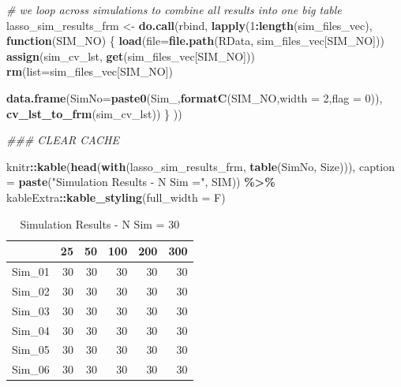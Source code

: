 \documentclass[
]{book}
\newenvironment{Shaded}{\begin{snugshade}}{\end{snugshade}}
\newcommand{\CommentTok}[1]{\textcolor[rgb]{0.56,0.35,0.01}{\textit{#1}}}
\newcommand{\ControlFlowTok}[1]{\textcolor[rgb]{0.13,0.29,0.53}{\textbf{#1}}}
\newcommand{\DataTypeTok}[1]{\textcolor[rgb]{0.13,0.29,0.53}{#1}}
\newcommand{\DecValTok}[1]{\textcolor[rgb]{0.00,0.00,0.81}{#1}}
\newcommand{\KeywordTok}[1]{\textcolor[rgb]{0.13,0.29,0.53}{\textbf{#1}}}
\newcommand{\NormalTok}[1]{#1}
\newcommand{\OperatorTok}[1]{\textcolor[rgb]{0.81,0.36,0.00}{\textbf{#1}}}
\newcommand{\StringTok}[1]{\textcolor[rgb]{0.31,0.60,0.02}{#1}}
\begin{document}
\begin{Shaded}
\begin{Highlighting}[]
\CommentTok{\# we loop across simulations to combine all results into one big table}
\NormalTok{lasso\_sim\_results\_frm <{-}}\StringTok{ }\KeywordTok{do.call}\NormalTok{(}\StringTok{\textquotesingle{}rbind\textquotesingle{}}\NormalTok{, }\KeywordTok{lapply}\NormalTok{(}\DecValTok{1}\OperatorTok{:}\KeywordTok{length}\NormalTok{(sim\_files\_vec),}
 \ControlFlowTok{function}\NormalTok{(SIM\_NO) \{}
  \KeywordTok{load}\NormalTok{(}\DataTypeTok{file=}\KeywordTok{file.path}\NormalTok{(}\StringTok{\textquotesingle{}RData\textquotesingle{}}\NormalTok{, sim\_files\_vec[SIM\_NO]))}
  \KeywordTok{assign}\NormalTok{(}\StringTok{\textquotesingle{}sim\_cv\_lst\textquotesingle{}}\NormalTok{, }\KeywordTok{get}\NormalTok{(sim\_files\_vec[SIM\_NO]))}
  \KeywordTok{rm}\NormalTok{(}\DataTypeTok{list=}\NormalTok{sim\_files\_vec[SIM\_NO])}
  
  \KeywordTok{data.frame}\NormalTok{(}\DataTypeTok{SimNo=}\KeywordTok{paste0}\NormalTok{(}\StringTok{\textquotesingle{}Sim\_\textquotesingle{}}\NormalTok{,}\KeywordTok{formatC}\NormalTok{(SIM\_NO,}\DataTypeTok{width =} \DecValTok{2}\NormalTok{,}\DataTypeTok{flag =} \DecValTok{0}\NormalTok{)), }\KeywordTok{cv\_lst\_to\_frm}\NormalTok{(sim\_cv\_lst))}
\NormalTok{\} }
\NormalTok{)) }
\end{Highlighting}
\end{Shaded}

\begin{Shaded}
\begin{Highlighting}[]
\CommentTok{\#\#\# CLEAR CACHE}
 
\NormalTok{knitr}\OperatorTok{::}\KeywordTok{kable}\NormalTok{(}\KeywordTok{head}\NormalTok{(}\KeywordTok{with}\NormalTok{(lasso\_sim\_results\_frm, }\KeywordTok{table}\NormalTok{(SimNo, Size))),}
  \DataTypeTok{caption =} \KeywordTok{paste}\NormalTok{(}\StringTok{"Simulation Results {-} N Sim ="}\NormalTok{, SIM)) }\OperatorTok{\%>\%}
\StringTok{   }\NormalTok{kableExtra}\OperatorTok{::}\KeywordTok{kable\_styling}\NormalTok{(}\DataTypeTok{full\_width =}\NormalTok{ F)}
\end{Highlighting}
\end{Shaded}

\begin{table}

\caption{\label{tab:sum-table}Simulation Results - N Sim = 30}
\centering
\begin{tabular}[t]{l|r|r|r|r|r}
\hline
  & 25 & 50 & 100 & 200 & 300\\
\hline
Sim\_01 & 30 & 30 & 30 & 30 & 30\\
\hline
Sim\_02 & 30 & 30 & 30 & 30 & 30\\
\hline
Sim\_03 & 30 & 30 & 30 & 30 & 30\\
\hline
Sim\_04 & 30 & 30 & 30 & 30 & 30\\
\hline
Sim\_05 & 30 & 30 & 30 & 30 & 30\\
\hline
Sim\_06 & 30 & 30 & 30 & 30 & 30\\
\hline
\end{tabular}
\end{table}
\end{document}

